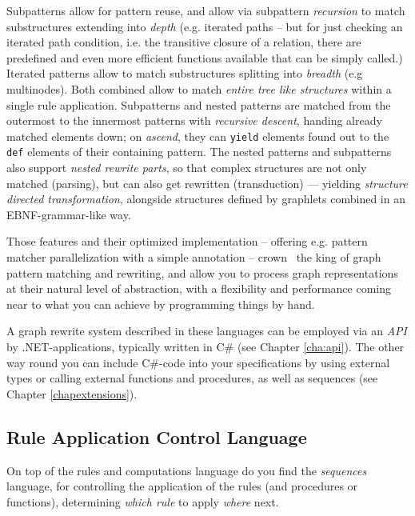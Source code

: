 Subpatterns allow for pattern reuse, and allow via subpattern \emph{recursion} to match substructures extending into \emph{depth} (e.g. iterated paths -- but for just checking an iterated path condition, i.e. the transitive closure of a relation, there are predefined and even more efficient functions available that can be simply called.)
Iterated patterns allow to match substructures splitting into \emph{breadth} (e.g multinodes).
Both combined allow to match \emph{entire tree like structures} within a single rule application. 
Subpatterns and nested patterns are matched from the outermost to the innermost patterns with \emph{recursive descent}, handing already matched elements down; on \emph{ascend}, they can \texttt{yield} elements found out to the \texttt{def} elements of their containing pattern.
The nested patterns and subpatterns also support \emph{nested rewrite parts}, so that complex structures are not only matched (parsing), but can also get rewritten (transduction) --- yielding \emph{structure directed transformation}, alongside structures defined by graphlets combined in an EBNF-grammar-like way\cite{EBNFAGTIVE}.

Those features and their optimized implementation -- offering e.g. pattern matcher parallelization with a simple annotation -- crown \GrG\ the king of graph pattern matching and rewriting, and allow you to process graph representations at their natural level of abstraction, with a flexibility and performance coming near to what you can achieve by programming things by hand.

A graph rewrite system described in these languages can be employed via an \emph{API} by .NET-applications, typically written in C\# (see Chapter \ref{cha:api}).
The other way round you can include C\#-code into your specifications by using external types or calling external functions and procedures, as well as sequences (see Chapter \ref{chapextensions}).

\subsection{Rule Application Control Language}
On top of the rules and computations language do you find the \emph{sequences} language, for controlling the application of the rules (and procedures or functions), determining \emph{which rule} to apply \emph{where} next. 

